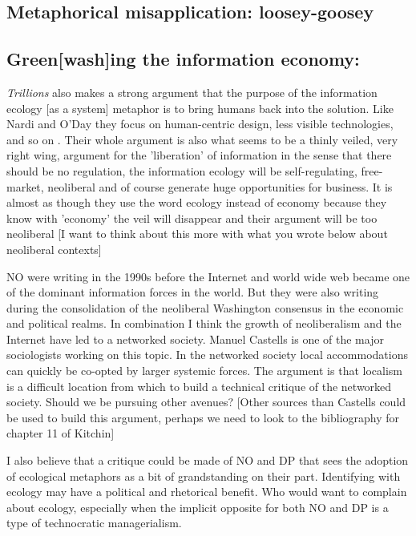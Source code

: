 \subsection{Metaphorical misapplication: loosey-goosey}


\subsection{Green[wash]ing the information economy:}

\textit{Trillions} also makes a strong argument that the purpose of the information ecology [as a system] metaphor is to bring humans back into the solution. Like Nardi and O'Day they focus on human-centric design, less visible technologies, and so on \citep{lucas_2012}. Their whole argument is also what seems to be a thinly veiled, very right wing, argument for the 'liberation' of information in the sense that there should be no regulation, the information ecology will be self-regulating, free-market, neoliberal and of course generate huge opportunities for business. It is almost as though they use the word ecology instead of economy because they know with 'economy' the veil will disappear and their argument will be too neoliberal [I want to think about this more with what you wrote below about neoliberal contexts]

NO were writing in the 1990s before the Internet and world wide web became one of the dominant information forces in the world. But they were also writing during the consolidation of the neoliberal Washington consensus in the economic and political realms. In combination I think the growth of neoliberalism and the Internet have led to a networked society. Manuel Castells is one of the major sociologists working on this topic. In the networked society local accommodations can quickly be co-opted by larger systemic forces. The argument is that localism is a difficult location from which to build a technical critique of the networked society. Should we be pursuing other avenues? [Other sources than Castells could be used to build this argument, perhaps we need to look to the bibliography for chapter 11 of Kitchin]


I also believe that a critique could be made of NO and DP that sees the adoption of ecological metaphors as a bit of grandstanding on their part. Identifying with ecology may have a political and rhetorical benefit. Who would want to complain about ecology, especially when the implicit opposite for both NO and DP is a type of technocratic managerialism.

